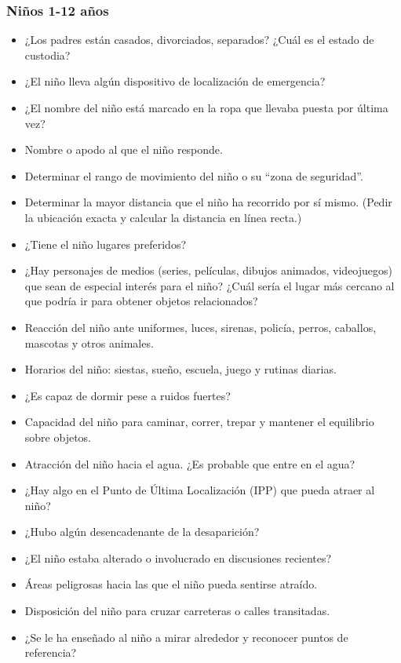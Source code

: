 \subsubsection{Niños 1-12 años}
\begin{itemize}
    \item ¿Los padres están casados, divorciados, separados? ¿Cuál es el estado de custodia?
    \item ¿El niño lleva algún dispositivo de localización de emergencia?
    \item ¿El nombre del niño está marcado en la ropa que llevaba puesta por última vez?
    \item Nombre o apodo al que el niño responde.
    \item Determinar el rango de movimiento del niño o su “zona de seguridad”.
    \item Determinar la mayor distancia que el niño ha recorrido por sí mismo. (Pedir la ubicación exacta y calcular la distancia en línea recta.)
    \item ¿Tiene el niño lugares preferidos?
    \item ¿Hay personajes de medios (series, películas, dibujos animados, videojuegos) que sean de especial interés para el niño? ¿Cuál sería el lugar más cercano al que podría ir para obtener objetos relacionados?
    \item Reacción del niño ante uniformes, luces, sirenas, policía, perros, caballos, mascotas y otros animales.
    \item Horarios del niño: siestas, sueño, escuela, juego y rutinas diarias. 
    \item ¿Es capaz de dormir pese a ruidos fuertes?
    \item Capacidad del niño para caminar, correr, trepar y mantener el equilibrio sobre objetos.
    \item Atracción del niño hacia el agua. ¿Es probable que entre en el agua?
    \item ¿Hay algo en el Punto de Última Localización (IPP) que pueda atraer al niño?
    \item ¿Hubo algún desencadenante de la desaparición?
    \item ¿El niño estaba alterado o involucrado en discusiones recientes?
    \item Áreas peligrosas hacia las que el niño pueda sentirse atraído.
    \item Disposición del niño para cruzar carreteras o calles transitadas.
    \item ¿Se le ha enseñado al niño a mirar alrededor y reconocer puntos de referencia?

\end{itemize}
